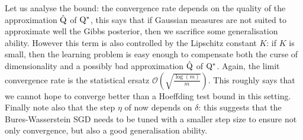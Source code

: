 Let us analyse the bound: the convergence rate depends on the quality of the approximation $\hat{\mathrm{Q}}$ of $\mathrm{Q}^*$, this says that if Gaussian measures are not suited to approximate well the Gibbs posterior, then we sacrifice some generalisation ability. However this term is also controlled by the Lipschitz constant $K$: if $K$ is small, then the learning problem is easy enough to compensate both the curse of dimensionality and a possibly bad approximation $\hat{\mathrm{Q}}$ of $\mathrm{Q}^*$.
Again, the limit convergence rate is the statistical ersatz $\mathcal{O}\left( \sqrt{\frac{\log(m)}{m}} \right)$. This roughly says that we cannot hope to converge better than a Hoeffding test bound in this setting. Finally note also that the step $\eta$ of  now depends on $\delta$: this suggests that the Bures-Wasserstein SGD needs to be tuned with a smaller step size to ensure not only convergence, but also a good generalisation ability.
